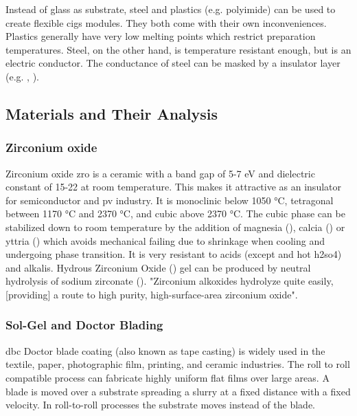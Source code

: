 %
Instead of glass as substrate, steel and plastics (e.g. polyimide\cite{feurer2017cigs}) can be used to create flexible \gls{cigs} modules. 
They both come with their own inconveniences. 
Plastics generally have very low melting points which restrict preparation temperatures.
Steel, on the other hand, is temperature resistant enough, but is an electric conductor. 
The conductance of steel can be masked by a insulator layer (e.g. , ).

\subsection{Materials and Their Analysis}
\subsubsection{Zirconium oxide}
Zirconium oxide \gls{zro} is a ceramic with a band gap of 5-7 eV and dielectric constant of 15-22 at room temperature\cite{Anwar2017}. 
This makes it attractive as an insulator for semiconductor and \gls{pv} industry. 
It is monoclinic below 1050 °C, tetragonal between 1170 °C and 2370 °C, and cubic above 2370 °C\cite{Nielsen2005}.
The cubic phase can be stabilized down to room temperature by the addition of magnesia (), calcia () or yttria () which avoids mechanical failing due to shrinkage 
when cooling and undergoing phase transition\cite{Nielsen2005}.
It is very resistant to acids (except  and hot \gls{h2so4}) and alkalis\cite{Nielsen2005}.
Hydrous Zirconium Oxide () gel can be produced by neutral hydrolysis of sodium zirconate (). 
"Zirconium alkoxides hydrolyze quite easily, [providing] a route to high purity, high-surface-area zirconium oxide"\cite{Nielsen2005}.

\subsubsection{Sol-Gel and Doctor Blading}
%
\Gls{dbc} Doctor blade coating (also known as tape casting) is widely used in the textile, paper, photographic film, printing, and ceramic industries.
The roll to roll compatible process can fabricate highly uniform flat films over large areas\cite{yang2010large}.
A blade is moved over a substrate spreading a slurry at a fixed distance with a fixed velocity.
In roll-to-roll processes the substrate moves instead of the blade. 

